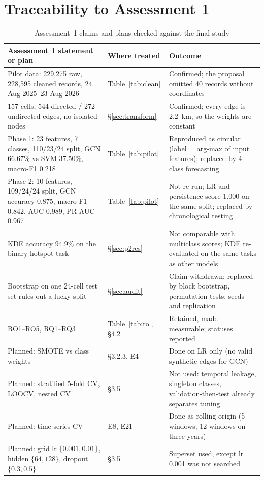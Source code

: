 \documentclass[11pt,a4paper]{report}
\begin{document}
\chapter{Traceability to Assessment 1}
\label{app:a1}
\begin{table}[H]
\centering\scriptsize
\caption{Assessment~1 claims and plans checked against the final study}
\label{tab:a1}
\begin{tabularx}{\textwidth}{@{}L{4.6cm} L{2.9cm} Y@{}}
\toprule
Assessment 1 statement or plan & Where treated & Outcome\\
\midrule
Pilot data: 229,275 raw, 228,595 cleaned records, 24 Aug 2025--23 Aug 2026 & Table~\ref{tab:clean} & Confirmed; the proposal omitted 40 records without coordinates\\
157 cells, 544 directed / 272 undirected edges, no isolated nodes & \S\ref{sec:transform} & Confirmed; every edge is 2.2~km, so the weights are constant\\
Phase 1: 23 features, 7 classes, 110/23/24 split, GCN 66.67\% vs SVM 37.50\%, macro-F1 0.218 & Table~\ref{tab:pilot} & Reproduced as circular (label = arg-max of input features); replaced by 4-class forecasting\\
Phase 2: 10 features, 109/24/24 split, GCN accuracy 0.875, macro-F1 0.842, AUC 0.989, PR-AUC 0.967 & Table~\ref{tab:pilot} & Not re-run; LR and persistence score 1.000 on the same split; replaced by chronological testing\\
KDE accuracy 94.9\% on the binary hotspot task & \S\ref{sec:p2res} & Not comparable with multiclass scores; KDE re-evaluated on the same tasks as other models\\
Bootstrap on one 24-cell test set rules out a lucky split & \S\ref{sec:audit} & Claim withdrawn; replaced by block bootstrap, permutation tests, seeds and replication\\
RO1--RO5, RQ1--RQ3 & Table~\ref{tab:ro}, \S4.2 & Retained, made measurable; statuses reported\\
Planned: SMOTE vs class weights & \S3.2.3, E4 & Done on LR only (no valid synthetic edges for GCN)\\
Planned: stratified 5-fold CV, LOOCV, nested CV & \S3.5 & Not used: temporal leakage, singleton classes, validation-then-test already separates tuning\\
Planned: time-series CV & E8, E21 & Done as rolling origin (5 windows; 12 windows on three years)\\
Planned: grid lr $\{0.001,0.01\}$, hidden $\{64,128\}$, dropout $\{0.3,0.5\}$ & \S3.5 & Superset used, except lr 0.001 was not searched\\

\end{tabularx}
\end{table}
\end{document}
